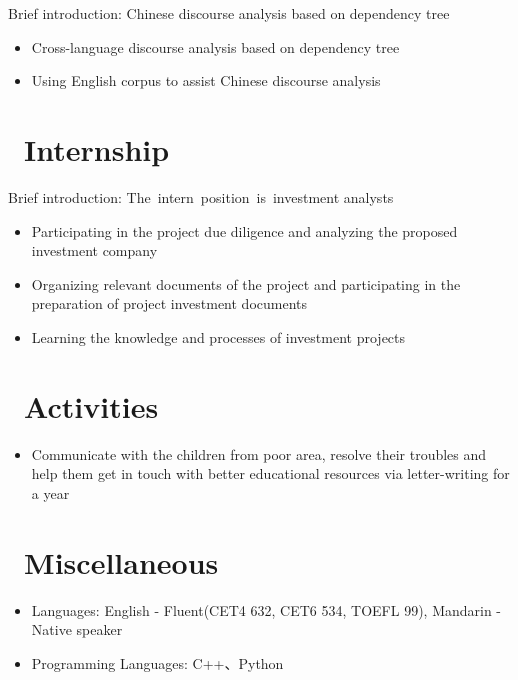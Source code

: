 \documentclass{resume}
\begin{document}
Brief introduction: Chinese discourse analysis based on dependency tree
\begin{itemize}
  \item Cross-language discourse analysis based on dependency tree
  \item Using English corpus to assist Chinese discourse analysis
\end{itemize}


\section{\faCogs\ Internship}
Brief introduction: The intern position is investment analysts
\begin{itemize}
  \item Participating in the project due diligence and analyzing the proposed investment company
  \item Organizing relevant documents of the project and participating in the preparation of project investment documents
  \item Learning the knowledge and processes of investment projects
\end{itemize}

\section{\faHeartO\ Activities}
\begin{itemize}
  \item Communicate with the children from poor area, resolve their troubles and help them get in touch with better educational resources via letter-writing for a year
\end{itemize}

\section{\faInfo\ Miscellaneous}
\begin{itemize}[parsep=0.5ex]
  \item Languages: English - Fluent(CET4 632, CET6 534, TOEFL 99), Mandarin - Native speaker
  \item Programming Languages: C++、Python
\end{itemize}

%
%
\end{document}
